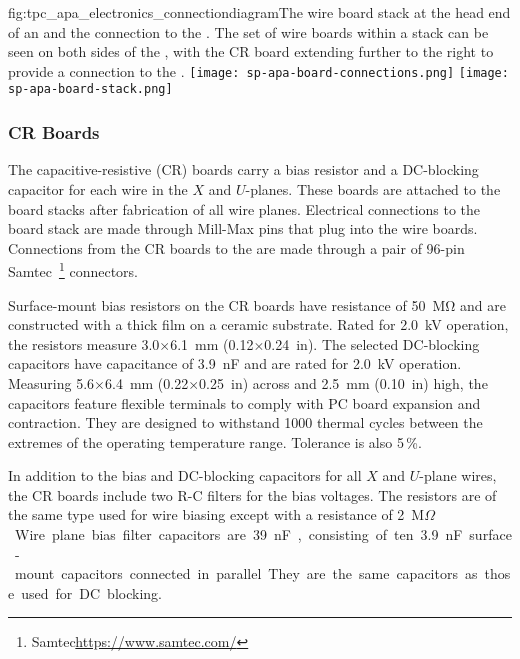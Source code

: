 \begin{dunefigure}{fig:tpc_apa_electronics_connectiondiagram}{The wire board stack at the head end of an  and the connection to the . The set of wire boards within a stack can be seen on both sides of the , with the CR board extending further to the right to provide a connection to the .}
\texttt{[image: sp-apa-board-connections.png]}
\texttt{[image: sp-apa-board-stack.png]}
\end{dunefigure} 


\subsubsection{CR Boards}
\label{sec:crboards}

The capacitive-resistive (CR) boards carry a bias resistor and a DC-blocking capacitor for each wire in the $X$ and $U$-planes. These boards are attached to the board stacks after fabrication of all wire planes.   Electrical connections to the board stack are made through Mill-Max pins that plug into the wire boards. Connections from the CR boards to the  are made through a pair of \num{96}-pin Samtec~\footnote{Samtec\texttrademark \url{https://www.samtec.com/}} connectors.

Surface-mount bias resistors on the CR boards have resistance of \SI{50}{\mega\ohm} and are constructed with a thick film on a ceramic substrate. Rated for \SI{2.0}{kV} operation, the resistors measure \num{3.0}$\times$\SI{6.1}{mm} (\num{0.12}$\times$\SI{0.24}{in}). The selected DC-blocking capacitors have capacitance of \SI{3.9}{nF} and are rated for \SI{2.0}{kV} operation. Measuring \num{5.6}$\times$\SI{6.4}{mm} (\num{0.22}$\times$\SI{0.25}{in}) across and \SI{2.5}{mm} (\SI{0.10}{in}) high, the capacitors feature flexible terminals to comply with PC board expansion and contraction. They are designed to withstand \num{1000} thermal cycles between the extremes of the operating temperature range. Tolerance is also \num{5}\,\%.

In addition to the bias and DC-blocking capacitors for all $X$ and $U$-plane wires, the CR boards include two R-C filters for the bias voltages. The resistors are of the same type used for wire biasing except with a resistance of \SI{2}{M$\Omega$}. Wire plane bias filter capacitors are \SI{39}{nF}, consisting of ten \SI{3.9}{nF} surface-mount capacitors connected in parallel. They are the same capacitors as those used for DC blocking.

